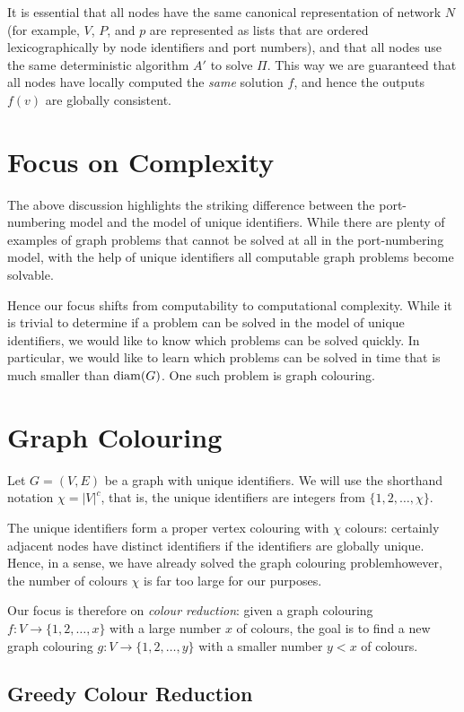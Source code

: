 It is essential that all nodes have the same canonical representation of network $N$ (for example, $V$, $P$, and $p$ are represented as lists that are ordered lexicographically by node identifiers and port numbers), and that all nodes use the same deterministic algorithm $A'$ to solve $\Pi$. This way we are guaranteed that all nodes have locally computed the \emph{same} solution $f$, and hence the outputs $f(v)$ are globally consistent.


\section{Focus on Complexity}

The above discussion highlights the striking difference between the port-numbering model and the model of unique identifiers. While there are plenty of examples of graph problems that cannot be solved at all in the port-numbering model, with the help of unique identifiers all computable graph problems become solvable.

Hence our focus shifts from computability to computational complexity. While it is trivial to determine if a problem can be solved in the model of unique identifiers, we would like to know which problems can be solved quickly. In particular, we would like to learn which problems can be solved in time that is much smaller than $\operatorname{diam}(G)$. One such problem is graph colouring.


\section{Graph Colouring}

Let $G = (V,E)$ be a graph with unique identifiers. We will use the shorthand notation $\chi = |V|^c$, that is, the unique identifiers are integers from $\{1,2,\dotsc,\chi\}$.

The unique identifiers form a proper vertex colouring with $\chi$ colours: certainly adjacent nodes have distinct identifiers if the identifiers are globally unique. Hence, in a sense, we have already solved the graph colouring problem\mydash however, the number of colours $\chi$ is far too large for our purposes.

Our focus is therefore on \emph{colour reduction}: given a graph colouring $f\colon V \to \{1,2,\dotsc,x\}$ with a large number $x$ of colours, the goal is to find a new graph colouring $g\colon V \to \{1,2,\dotsc,y\}$ with a smaller number $y < x$ of colours.


\subsection{Greedy Colour Reduction}\label{ssec:greedy}

